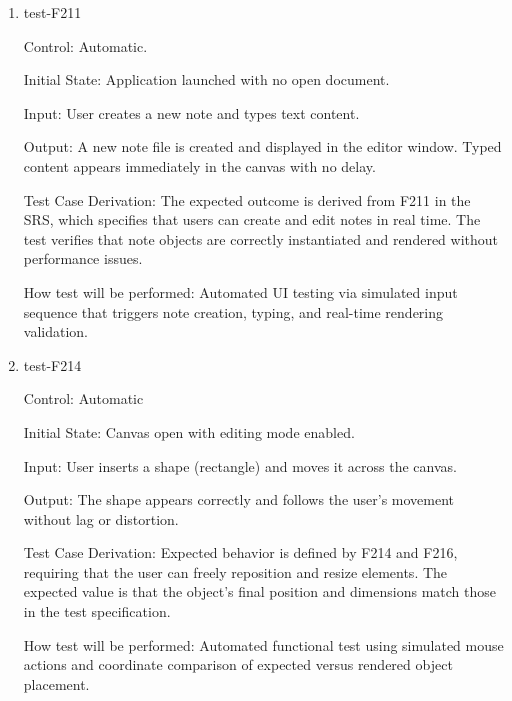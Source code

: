 \documentclass[12pt, titlepage]{article}
\begin{document}
\begin{enumerate}

\item{test-F211\\}

Control: Automatic.

Initial State: Application launched with no open document.

Input: User creates a new note and types text content.

Output: 
A new note file is created and displayed in the editor window. Typed content appears
immediately in the canvas with no delay.

Test Case Derivation: 
The expected outcome is derived from F211 in the SRS, which specifies that users can create and edit notes in real time.
The test verifies that note objects are correctly instantiated and rendered without performance issues.

How test will be performed: Automated UI testing via simulated input sequence that triggers note creation, typing,
and real-time rendering validation.

\item{test-F214\\}

Control: Automatic

Initial State: Canvas open with editing mode enabled.

Input: User inserts a shape (rectangle) and moves it across the canvas.

Output: 
The shape appears correctly and follows the user’s movement without lag or distortion.

Test Case Derivation: 
Expected behavior is defined by F214 and F216, requiring that the user can freely reposition and resize elements.
The expected value is that the object’s final position and dimensions match those in the test specification.

How test will be performed: Automated functional test using simulated mouse actions and coordinate comparison of
expected versus rendered object placement.

\end{enumerate}
\end{document}
